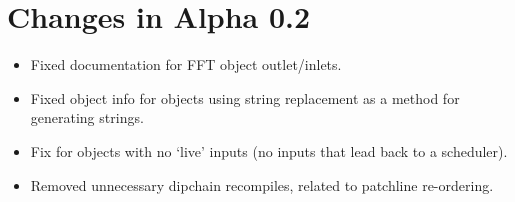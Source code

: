 \documentclass{article}
\begin{document}
\pagebreak

\section{Changes in Alpha 0.2}
\vspace{0.1in}

\begin{itemize}
\item Fixed documentation for FFT object outlet/inlets.
\item Fixed object info for objects using string replacement as a method for generating strings.
\item Fix for objects with no `live' inputs (no inputs that lead back to a scheduler).
\item Removed unnecessary dipchain recompiles, related to patchline re-ordering.
\end{itemize}
\end{document}
